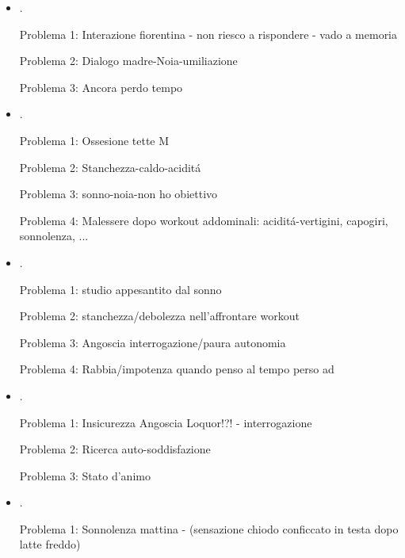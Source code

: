 \begin{itemize}
Problema 1: Non farsi scudo del babbo, non aver paura di ripetere il babbo


Problema 2: Workout ginnastica in vista di un obiettivo

Problema 3: Condizione studio come abitudine/dovere

\item {}.

Problema 1: Interazione fiorentina - non riesco a rispondere - vado a memoria

Problema 2: Dialogo madre-Noia-umiliazione

Problema 3: Ancora perdo tempo

\item {}.

Problema 1: Ossesione tette M

Problema 2: Stanchezza-caldo-acidit\'a

Problema 3: sonno-noia-non ho obiettivo

Problema 4: Malessere dopo workout addominali: acidit\'a-vertigini, capogiri, sonnolenza, ...


\item {}.


Problema 1: studio appesantito dal sonno

Problema 2: stanchezza/debolezza nell'affrontare workout

Problema 3: Angoscia interrogazione/paura autonomia

Problema 4: Rabbia/impotenza quando penso al tempo perso ad 

\item {}.

Problema 1: Insicurezza Angoscia Loquor!?! - interrogazione

Problema 2: Ricerca auto-soddisfazione

Problema 3: Stato d'animo 

\item {}.

Problema 1: Sonnolenza mattina -  (sensazione chiodo conficcato in testa dopo latte freddo)


\end{itemize}
